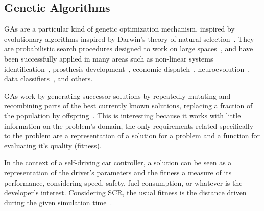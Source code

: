 \subsection{Genetic Algorithms}

GAs are a particular kind of genetic optimization mechanism, inspired by evolutionary algorithms inspired by Darwin's theory of natural selection~\cite{GA}. They are probabilistic search procedures designed to work on large spaces~\cite{goldberg1988}, and have been successfully applied in many areas such as non-linear systems identification~\cite{GACTRL}, prosthesis development~\cite{GABIO}, economic dispatch~\cite{GAECO}, neuroevolution~\cite{stanley_real-time_2005}, data classifiers~\cite{pedrycz_genetic_2005}, and others.

GAs work by generating successor solutions by repeatedly mutating and recombining parts of the best currently known solutions, replacing a fraction of the population by offspring~\cite{mitchell_1997}. This is interesting because it works with little information on the problem's domain, the only requirements related specifically to the problem are a representation of a solution for a problem and a function for evaluating it's quality (fitness).

In the context of a self-driving car controller, a solution can be seen as a representation of the driver's parameters and the fitness a measure of its performance, considering speed, safety, fuel consumption, or whatever is the developer's interest. Considering SCR, the usual fitness is the distance driven during the given simulation time~\cite{2009}.
